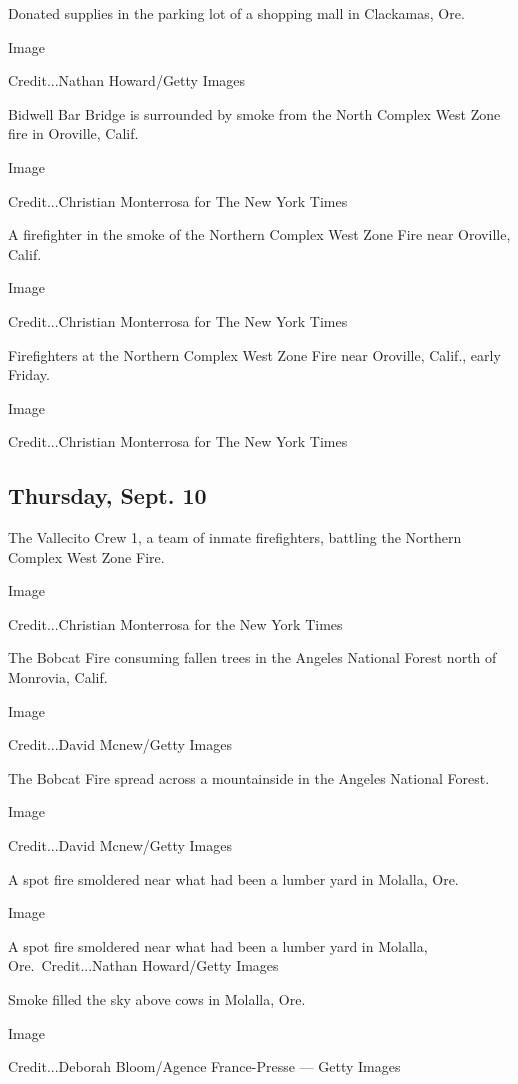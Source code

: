 Donated supplies in the parking lot of a shopping mall in Clackamas,
Ore.

Image

Credit...Nathan Howard/Getty Images

Bidwell Bar Bridge is surrounded by smoke from the North Complex West
Zone fire in Oroville, Calif.

Image

Credit...Christian Monterrosa for The New York Times

A firefighter in the smoke of the Northern Complex West Zone Fire near
Oroville, Calif.

Image

Credit...Christian Monterrosa for The New York Times

Firefighters at the Northern Complex West Zone Fire near Oroville,
Calif., early Friday.

Image

Credit...Christian Monterrosa for The New York Times

\hypertarget{thursday-sept-10}{%
\subsection{Thursday, Sept. 10}\label{thursday-sept-10}}

The Vallecito Crew 1, a team of inmate firefighters, battling the
Northern Complex West Zone Fire.

Image

Credit...Christian Monterrosa for the New York Times

The Bobcat Fire consuming fallen trees in the Angeles National Forest
north of Monrovia, Calif.

Image

Credit...David Mcnew/Getty Images

The Bobcat Fire spread across a mountainside in the Angeles National
Forest.

Image

Credit...David Mcnew/Getty Images

A spot fire smoldered near what had been a lumber yard in Molalla, Ore.

Image

A spot fire smoldered near what had been a lumber yard in Molalla,
Ore.~Credit...Nathan Howard/Getty Images

Smoke filled the sky above cows in Molalla, Ore.

Image

Credit...Deborah Bloom/Agence France-Presse --- Getty Images


